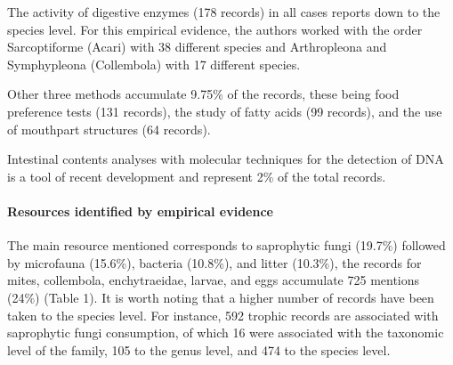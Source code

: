 \documentclass[11pt]{article}
\begin{document}
The activity of digestive enzymes (178 records) in all cases reports
down to the species level. For this empirical evidence, the authors
worked with the order Sarcoptiforme (Acari) with 38 different species
and Arthropleona and Symphypleona (Collembola) with 17 different
species.

Other three methods accumulate 9.75\% of the records, these being food
preference tests (131 records), the study of fatty acids (99 records),
and the use of mouthpart structures (64 records).

Intestinal contents analyses with molecular techniques for the detection
of DNA is a tool of recent development and represent 2\% of the total
records.

\hypertarget{resources-identified-by-empirical-evidence}{%
\paragraph{Resources identified by empirical
evidence}\label{resources-identified-by-empirical-evidence}}

The main resource mentioned corresponds to saprophytic fungi (19.7\%)
followed by microfauna (15.6\%), bacteria (10.8\%), and litter (10.3\%),
the records for mites, collembola, enchytraeidae, larvae, and eggs
accumulate 725 mentions (24\%) (Table 1). It is worth noting that a
higher number of records have been taken to the species level. For
instance, 592 trophic records are associated with saprophytic fungi
consumption, of which 16 were associated with the taxonomic level of the
family, 105 to the genus level, and 474 to the species level.
\end{document}
